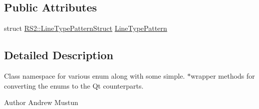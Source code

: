 \subsection*{Public Attributes}
\begin{DoxyCompactItemize}
\item 
struct \hyperlink{struct_r_s2_1_1_line_type_pattern_struct}{R\-S2\-::\-Line\-Type\-Pattern\-Struct} \hyperlink{class_r_s2_a329d8aaa6876234c5838fb4719a69549}{Line\-Type\-Pattern}
\end{DoxyCompactItemize}


\subsection{Detailed Description}
Class namespace for various enum along with some simple. $\ast$wrapper methods for converting the enums to the Qt counterparts.

\begin{DoxyAuthor}{Author}
Andrew Mustun 
\end{DoxyAuthor}


